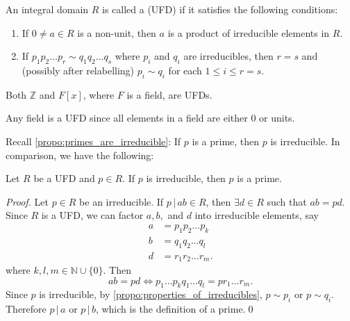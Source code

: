 \begin{defn}
\label{defn:unique_factorization_domain}
  An integral domain $R$ is called a  (UFD) if it satisfies the following conditions:
  \begin{enumerate}
    \item If $0 \neq a \in R$ is a non-unit, then $a$ is a product of irreducible elements in $R$.
    \item If $p_1 p_2 \hdots p_r \sim q_1 q_2 \hdots q_s$ where $p_i$ and $q_i$ are irreducibles, then $r = s$ and (possibly after relabelling) $p_i \sim q_i$ for each $1 \leq i \leq r = s$.
  \end{enumerate}
\end{defn}

\begin{eg}
  Both $\mathbb{Z}$ and $F[x]$, where $F$ is a field, are UFDs.
\end{eg}

\begin{eg}
  Any field is a UFD since all elements in a field are either $0$ or units.
\end{eg}

Recall \cref{propo:primes_are_irreducible}: If $p$ is a prime, then $p$ is irreducible. In comparison, we have the following:

\begin{propo}
\label{propo:irreducibles_are_primes_in_a_ufd}
  Let $R$ be a UFD and $p \in R$. If $p$ is irreducible, then $p$ is a prime.
\end{propo}

\begin{proof}
  Let $p \in R$ be an irreducible. If $p \, | \, ab \in R$, then $\exists d \in R$ such that $ab = pd$. Since $R$ is a UFD, we can factor $a, b, $ and $d$ into irreducible elements, say
  \begin{align*}
    a &= p_1 p_2 \hdots p_k \\
    b &= q_1 q_2 \hdots q_l \\
    d &= r_1 r_2 \hdots r_m.
  \end{align*}
  where $k, l, m \in \mathbb{N} \cup \{0\}$. Then
  \begin{equation*}
    ab = pd \iff p_1 \hdots p_k q_1 \hdots q_l = p r_1 \hdots r_m.
  \end{equation*}
  Since $p$ is irreducible, by \cref{propo:properties_of_irreducibles}, $p \sim p_i$ or $p \sim q_i$. Therefore $p \, | \, a$ or $p \, | \, b$, which is the definition of a prime.\qed
\end{proof}

